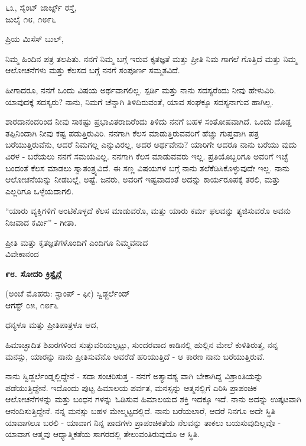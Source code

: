 \begin{flushright}
೬೩, ಸೈಂಟ್ ಜಾರ್ಜ್ಸ್ ರಸ್ತೆ,\\ಜುಲೈ ೧೮, ೧೮೯೬
\end{flushright}

ಪ್ರಿಯ ಮಿಸೆಸ್ ಬುಲ್,

ನಿಮ್ಮ ಹಿಂದಿನ ಪತ್ರ ತಲಪಿತು. ನನಗೆ ನಿಮ್ಮ ಬಗ್ಗೆ ಇರುವ ಕೃತಜ್ಞತೆ ಮತ್ತು ಪ್ರೀತಿ ನಿಮ ಗಾಗಲೆ ಗೊತ್ತಿದೆ ಮತ್ತು ನಿಮ್ಮ ಆಲೋಚನೆಗಳು ಮತ್ತು ಕೆಲಸದ ಬಗ್ಗೆ ನನಗೆ ಸಂಪೂರ್ಣ ಸಮ್ಮತವಿದೆ.

ಹೀಗಾದರೂ, ನನಗೆ ಒಂದು ವಿಷಯ ಅರ್ಥವಾಗಲಿಲ್ಲ. ಸ್ಪರ್ಡಿ ಮತ್ತು ನಾನು ಸದಸ್ಯರೆಂದು ನೀವು ಹೇಳುವಿರಿ. ಯಾವುದಕ್ಕೆ ಸದಸ್ಯರು? ನಾನು, ನಿಮಗೆ ಚೆನ್ನಾಗಿ ತಿಳಿದಿರುವಂತೆ, ಯಾವ ಸಂಘಕ್ಕೂ ಸದಸ್ಯನಾಗುವ ಹಾಗಿಲ್ಲ.

ಶಾರದಾನಂದರಿಂದ ನೀವು ಸಾಕಷ್ಟು ಪ್ರಭಾವಿತರಾದಿರೆಂದು ತಿಳಿದು ನನಗೆ ಬಹಳ ಸಂತೋಷವಾಗಿದೆ. ಒಂದು ದೊಡ್ಡ ತಪ್ಪಿನಿಂದಾಗಿ ನೀವು ಕಷ್ಟ ಪಡುತ್ತಿರುವಿರಿ. ನನಗಾಗಿ ಕೆಲಸ ಮಾಡುತ್ತಿರುವವರಿಗೆ ಹೆಚ್ಚು ಗುಪ್ತವಾಗಿ ಪತ್ರ ಬರೆಯುತ್ತಿರುವೆನು, ಆದರೆ ನಿಮಗಲ್ಲ ಎನ್ನುವಿರಲ್ಲ, ಅದರ ಅರ್ಥವೇನು? ಯಾರಿಗೇ ಆದರೂ ನಾನು ಬರೆಯು ವುದು ವಿರಳ - ಬರೆಯಲು ನನಗೆ ಸಮಯವಿಲ್ಲ. ನನಗಾಗಿ ಕೆಲಸ ಮಾಡುವವರು ಇಲ್ಲ. ಪ್ರತಿಯೊಬ್ಬರಿಗೂ ಅವರಿಗೆ ಇಚ್ಛೆ ಬಂದಂತೆ ಕೆಲಸ ಮಾಡಲು ಸ್ವಾತಂತ್ರ್ಯವಿದೆ. ಈ ಸಣ್ಣ ವಿಷಯಗಳ ಬಗ್ಗೆ ನಾನು ತಲೆಕೆಡಿಸಿಕೊಳ್ಳುವುದೇ ಇಲ್ಲ. ನಾನು ಆಲೋಚನೆಯನ್ನು ನೀಡಬಲ್ಲೆ, ಅಷ್ಟೆ. ಜನರು, ಅವರಿಗೆ ಇಷ್ಟವಾದಂತೆ ಅದನ್ನು ಕಾರ್ಯರೂಪಕ್ಕೆ ತರಲಿ, ಮತ್ತು ಎಲ್ಲರಿಗೂ ಒಳ್ಳೆಯದಾಗಲಿ.

“ಯಾರು ವ್ಯಕ್ತಿಗಳಿಗೆ ಅಂಟಿಕೊಳ್ಳದೆ ಕೆಲಸ ಮಾಡುವರೊ, ಮತ್ತು ಯಾರು ಕರ್ಮ ಫಲವನ್ನು ತ್ಯಜಿಸುವರೊ ಅವನು ನಿಜವಾದ ಕರ್ಮಿ” - ಗೀತಾ.

\begin{flushright}
ಪ್ರೀತಿ ಮತ್ತು ಕೃತಜ್ಞತೆಗಳೊಂದಿಗೆ ಎಂದಿಗೂ ನಿಮ್ಮವನಾದ\\ವಿವೇಕಾನಂದ
\end{flushright}

\begin{center}
\textbf{೯೮. ಸೋದರಿ ಕ್ರಿಸ್ಟೈನ್ಗೆ}
\end{center}

\begin{flushright}
(ಅಂಚೆ ಮೊಹರು: ಸ್ಟಾಂಪ್ - ಫೀ) ಸ್ವಿಡ್ಜರ್ಲೆಂಡ್\\ಆಗಸ್ಟ್ ೦೫, ೧೮೯೬
\end{flushright}

ಧನ್ಯಳೂ ಮತ್ತು ಪ್ರೀತಿಪಾತ್ರಳೂ ಆದ,

ಹಿಮಾಚ್ಛಾದಿತ ಶಿಖರಗಳಿಂದ ಸುತ್ತುವರಿಯಲ್ಪಟ್ಟು, ಸುಂದರವಾದ ಕಾಡಿನಲ್ಲಿ ಹುಲ್ಲಿನ ಮೇಲೆ ಕುಳಿತಿರುತ್ತ, ನನ್ನ ಮನಸ್ಸು, ಯಾರನ್ನು ನಾನು ಪ್ರೀತಿಸುವೆನೊ ಅವರೆಡೆ ಹರಿಯುತ್ತಿದೆ - ಆ ಕಾರಣ ನಾನು ಬರೆಯುತ್ತಿರುವೆ.

ನಾನು ಸ್ವಿಡ್ಜರ್ಲೆಂಡ್ನಲ್ಲಿದ್ದೇನೆ - ಸದಾ ಸಂಚರಿಸುತ್ತ - ನನಗೆ ಅತ್ಯಾವಶ್ಯ ವಾಗಿ ಬೇಕಾಗಿದ್ದ ವಿಶ್ರಾಂತಿಯನ್ನು ಪಡೆಯುತ್ತಿದ್ದೇನೆ. ಇದೊಂದು ಪುಟ್ಟ ಹಿಮಾಲಯ ಪರ್ವತ, ಮನಸ್ಸನ್ನು ಆತ್ಮನಲ್ಲಿಗೆ ಏರಿಸಿ ಪ್ರಾಪಂಚಿಕ ಆಲೋಚನೆಗಳನ್ನು ಮತ್ತು ಬಂಧನ ಗಳನ್ನು ಓಡಿಸುವ ಹಿಮಾಲಯದ ಶಕ್ತಿ ಇದಕ್ಕೂ ಇದೆ. ನಾನು ಅದನ್ನು ಉತ್ಕಟವಾಗಿ ಆನಂದಿಸುತ್ತಿದ್ದೇನೆ. ನನ್ನ ಮನಸ್ಸು ಬಹಳ ಮೇಲ್ಮಟ್ಟದಲ್ಲಿದೆ. ನಾನು ಬರೆಯಲಾರೆ, ಆದರೆ ನಿನಗೂ ಅದೇ ಸ್ಥಿತಿ ಯಾವಾಗಲೂ ಬರಲಿ - ಯಾವಾಗ ನಿನ್ನ ಪಾದಗಳು ಪ್ರಾಪಂಚಿಕತೆಯ ನೆಲವನ್ನು ತಾಕಲು ಬಯಸುವುದಿಲ್ಲವೊ - ಯಾವಾಗ ಆತ್ಮವು ಆಧ್ಯಾತ್ಮಿಕತೆಯ ಸಾಗರದಲ್ಲಿ ತೇಲುವಂತಿರುವುದೊ ಆ ಸ್ಥಿತಿ.

